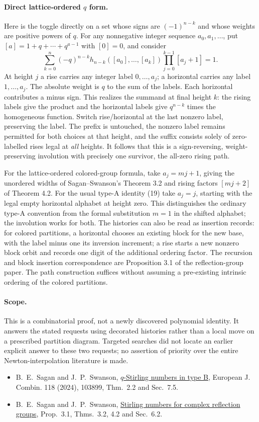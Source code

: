 \documentclass[11pt]{article}
\begin{document}
\paragraph{Direct lattice-ordered $q$ form.} Here is the toggle directly on a set whose signs are $(-1)^{n-k}$ and whose weights are positive powers of $q$. For any nonnegative integer sequence $a_0,a_1,\ldots$, put $[a]=1+q+\cdots+q^{a-1}$ with $[0]=0$, and consider
\[
\sum_{k=0}^n (-q)^{n-k}
h_{n-k}([a_0],\ldots,[a_k])
\prod_{j=0}^{k-1}[a_j+1]=1.
\]
At height $j$ a rise carries any integer label $0,\ldots,a_j$; a horizontal carries any label $1,\ldots,a_j$. The absolute weight is $q$ to the sum of the labels. Each horizontal contributes a minus sign. This realizes the summand at final height $k$: the rising labels give the product and the horizontal labels give $q^{n-k}$ times the homogeneous function. Switch rise/horizontal at the last nonzero label, preserving the label. The prefix is untouched, the nonzero label remains permitted for both choices at that height, and the suffix consists solely of zero-labelled rises legal at \emph{all} heights. It follows that this is a sign-reversing, weight-preserving involution with precisely one survivor, the all-zero rising path.
 
For the lattice-ordered colored-group formula, take $a_j=mj+1$, giving the unordered widths of Sagan--Swanson's Theorem 3.2 and rising factors $[mj+2]$ of Theorem 4.2. For the usual type-A identity (19) take $a_j=j$, starting with the legal empty horizontal alphabet at height zero. This distinguishes the ordinary type-A convention from the formal substitution $m=1$ in the shifted alphabet; the involution works for both. The histories can also be read as insertion records: for colored partitions, a horizontal chooses an existing block for the new base, with the label minus one its inversion increment; a rise starts a new nonzero block orbit and records one digit of the additional ordering factor. The recursion and block insertion correspondence are Proposition 3.1 of the reflection-group paper. The path construction suffices without assuming a pre-existing intrinsic ordering of the colored partitions.
\paragraph{Scope.} This is a combinatorial proof, not a newly discovered polynomial identity. It answers the stated requests using decorated histories rather than a local move on a prescribed partition diagram. Targeted searches did not locate an earlier explicit answer to these two requests; no assertion of priority over the entire Newton-interpolation literature is made.
\begin{itemize}
\item B.~E.~Sagan and J.~P.~Swanson, \href{https://users.math.msu.edu/users/bsagan/Papers/Old/qStB-pub.pdf}{$q$-Stirling numbers in type B}, European J. Combin. 118 (2024), 103899, Thm.~2.2 and Sec.~7.5.
\item B.~E.~Sagan and J.~P.~Swanson, \href{https://users.math.msu.edu/users/bsagan/Papers/Old/StG-doi.pdf}{Stirling numbers for complex reflection groups}, Prop.~3.1, Thms.~3.2, 4.2 and Sec.~6.2.
\end{itemize}
\end{document}

